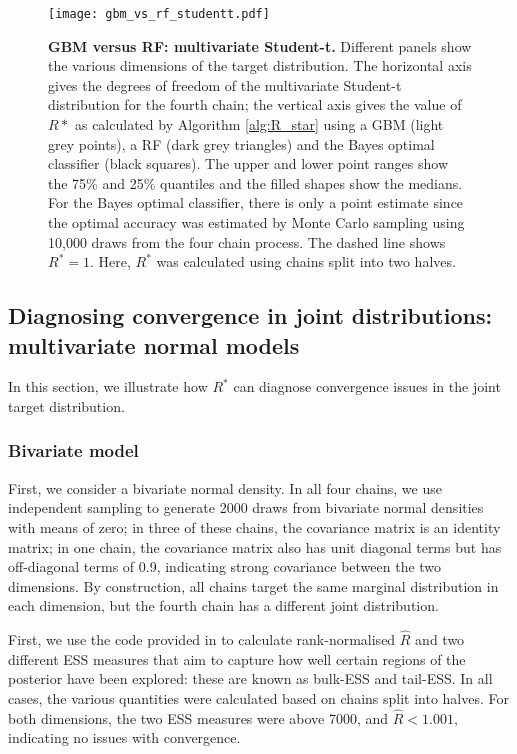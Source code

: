 \documentclass{article}
\begin{document}
\begin{figure}[!htb]
	\centerline{\texttt{[image: gbm\_vs\_rf\_studentt.pdf]}}
	\caption{\textbf{GBM versus RF: multivariate Student-t.} Different panels show the various dimensions of the target distribution. The horizontal axis gives the degrees of freedom of the multivariate Student-t distribution for the fourth chain; the vertical axis gives the value of $R*$ as calculated by Algorithm \ref{alg:R_star} using a GBM (light grey points), a RF (dark grey triangles) and the Bayes optimal classifier (black squares). The upper and lower point ranges show the 75\% and 25\% quantiles and the filled shapes show the medians. For the Bayes optimal classifier, there is only a point estimate since the optimal accuracy was estimated by Monte Carlo sampling using 10,000 draws from the four chain process. The dashed line shows $R^*=1$. Here, $R^*$ was calculated using chains split into two halves.}
	\label{fig:gbm_vs_rf_studdentt}
\end{figure}

\color{black}
\subsection{Diagnosing convergence in joint distributions: multivariate normal models}\label{sec:multivariate_normal}
In this section, we illustrate how $R^*$ can diagnose convergence issues in the joint target distribution.

\subsubsection{Bivariate model}\label{sec:multivariate_normal_bivariate}
First, we consider a bivariate normal density. In all four chains, we use independent sampling to generate 2000 draws from bivariate normal densities with means of zero; in three of these chains, the covariance matrix is an identity matrix; in one chain, the covariance matrix also has unit diagonal terms but has off-diagonal terms of 0.9, indicating strong covariance between the two dimensions. By construction, all chains target the same marginal distribution in each dimension, but the fourth chain has a different joint distribution.

First, we use the code provided in \cite{vehtari2019rank} to calculate rank-normalised $\widehat{R}$ and two different ESS measures that aim to capture how well certain regions of the posterior have been explored: these are known as bulk-ESS and tail-ESS. In all cases, the various quantities were calculated based on chains split into halves. For both dimensions, the two ESS measures were above 7000, and $\widehat{R}<1.001$, indicating no issues with convergence.
\end{document}

